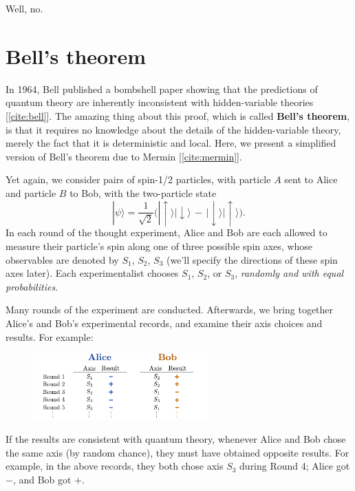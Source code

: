 \documentclass[pra,12pt]{revtex4-2}
\begin{document}
Well, no.

\section{Bell's theorem}
\label{sec:bell}

In 1964, Bell published a bombshell paper showing that the predictions
of quantum theory are inherently inconsistent with hidden-variable
theories [\ref{cite:bell}].  The amazing thing about this proof, which
is called \textbf{Bell's theorem}, is that it requires no knowledge
about the details of the hidden-variable theory, merely the fact that
it is deterministic and local.  Here, we present a simplified version
of Bell's theorem due to Mermin [\ref{cite:mermin}].

Yet again, we consider pairs of spin-1/2 particles, with particle $A$
sent to Alice and particle $B$ to Bob, with the two-particle state
\begin{equation}
  |\psi\rangle = \frac{1}{\sqrt{2}} \Big(|\!\uparrow\rangle|\!\downarrow\rangle \,-\, |\!\downarrow\rangle|\!\uparrow\rangle\Big).
  \label{bellsinglet}
\end{equation}
In each round of the thought experiment, Alice and Bob are each
allowed to measure their particle's spin along one of three possible
spin axes, whose observables are denoted by $S_1$, $S_2$, $S_3$ (we'll
specify the directions of these spin axes later).  Each
experimentalist chooses $S_1$, $S_2$, or $S_3$, \textit{randomly and
  with equal probabilities}.

Many rounds of the experiment are conducted.  Afterwards, we bring
together Alice's and Bob's experimental records, and examine their
axis choices and results.  For example:

\begin{figure}[h]
  \centering\includegraphics[width=0.6\textwidth]{bell}
\end{figure}

\noindent
If the results are consistent with quantum theory, whenever Alice and
Bob chose the same axis (by random chance), they must have obtained
opposite results.  For example, in the above records, they both chose
axis $S_3$ during Round 4; Alice got $-$, and Bob got $+$.
\end{document}
